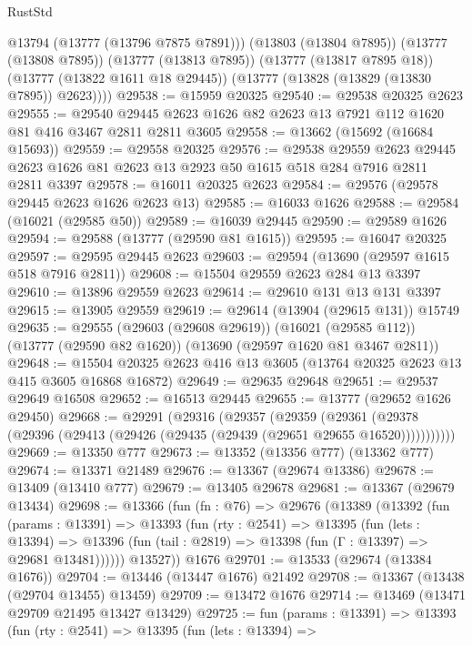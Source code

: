 \begin{lexlean}{RustStd}
\begin{coremodule}
          @13794
          (@13777 (@13796 @7875 @7891)))
        (@13803 (@13804 @7895))
        (@13777 (@13808 @7895))
        (@13777 (@13813 @7895))
        (@13777 (@13817 @7895 @18))
        (@13777 (@13822 @1611 @18 @29445))
        (@13777 (@13828 (@13829 (@13830 @7895)) @2623))))
@29538 := @15959 @20325
@29540 := @29538 @20325 @2623
@29555 := @29540 @29445 @2623 @1626 @82 @2623 @13 @7921 @112 @1620 @81 @416 @3467 @2811 @2811 @3605
@29558 := @13662 (@15692 (@16684 @15693))
@29559 := @29558 @20325
@29576 := @29538
    @29559
    @2623
    @29445
    @2623
    @1626
    @81
    @2623
    @13
    @2923
    @50
    @1615
    @518
    @284
    @7916
    @2811
    @2811
    @3397
@29578 := @16011 @20325 @2623
@29584 := @29576 (@29578 @29445 @2623 @1626 @2623 @13)
@29585 := @16033 @1626
@29588 := @29584 (@16021 (@29585 @50))
@29589 := @16039 @29445
@29590 := @29589 @1626
@29594 := @29588 (@13777 (@29590 @81 @1615))
@29595 := @16047 @20325
@29597 := @29595 @29445 @2623
@29603 := @29594 (@13690 (@29597 @1615 @518 @7916 @2811))
@29608 := @15504 @29559 @2623 @284 @13 @3397
@29610 := @13896 @29559 @2623
@29614 := @29610 @131 @13 @131 @3397
@29615 := @13905 @29559
@29619 := @29614 (@13904 (@29615 @131)) @15749
@29635 := @29555
    (@29603 (@29608 @29619))
    (@16021 (@29585 @112))
    (@13777 (@29590 @82 @1620))
    (@13690 (@29597 @1620 @81 @3467 @2811))
@29648 := @15504 @20325 @2623 @416 @13 @3605 (@13764 @20325 @2623 @13 @415 @3605 @16868 @16872)
@29649 := @29635 @29648
@29651 := @29537 @29649 @16508
@29652 := @16513 @29445
@29655 := @13777 (@29652 @1626 @29450)
@29668 := @29291
    (@29316
      (@29357
        (@29359
          (@29361 (@29378 (@29396 (@29413 (@29426 (@29435 (@29439 (@29651 @29655 @16520)))))))))))
@29669 := @13350 @777
@29673 := @13352 (@13356 @777) (@13362 @777)
@29674 := @13371 @21489
@29676 := @13367 (@29674 @13386)
@29678 := @13409 (@13410 @777)
@29679 := @13405 @29678
@29681 := @13367 (@29679 @13434)
@29698 := @13366
    (fun (fn : @76) =>
    @29676
      (@13389
        (@13392
          (fun (params : @13391) =>
          @13393
            (fun (rty : @2541) =>
            @13395
              (fun (lets : @13394) =>
              @13396 (fun (tail : @2819) => @13398 (fun (Γ : @13397) => @29681 @13481))))))
        @13527))
    @1676
@29701 := @13533 (@29674 (@13384 @1676))
@29704 := @13446 (@13447 @1676) @21492
@29708 := @13367 (@13438 (@29704 @13455) @13459)
@29709 := @13472 @1676
@29714 := @13469 (@13471 @29709 @21495 @13427 @13429)
@29725 := fun (params : @13391) =>
  @13393
    (fun (rty : @2541) =>
    @13395
      (fun (lets : @13394) =>

\end{coremodule}
\end{lexlean}
